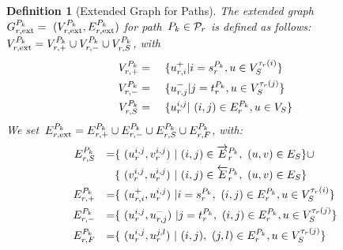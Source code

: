 \documentclass[10pt, conference, letterpaper]{IEEEtran}
\newtheorem{definition}[theorem]{Definition}
\begin{document}
\begin{definition}[Extended Graph for Paths]
\label{def:service-cactus-extended-graph-path}
The extended graph~$\VGextpath =~(\VVextpath, \VEextpath)$ for path~$P_k \in \Paths$ is defined as follows:
$\VVextpath = \VVextpathSources \cup \VVextpathTargets \cup \VVextpathSubstrate$, with
{
\small
\begin{alignat*}{3}
\VVextpathSources & = &&~ \{ u^+_{r,i} | i = \VVpathSource, u \in \SVTypes[\Vtype(i)]\}\\
\VVextpathTargets & = &&~  \{ u^-_{r,j} | j = \VVpathTarget, u \in \SVTypes[\Vtype(j)]\} \\
\VVextpathSubstrate & = &&~ \{ u^{i,j}_{r} |~(i,j) \in  \VEpath, u \in \SV \}
\end{alignat*}
}
We set~$\VEextpath = \VEextpathSources \cup \VEextpathTargets \cup \VEextpathSubstrate \cup \VEextpathF$, with:
{
\small
\begin{alignat*}{3}
\VEextpathSubstrate && = & \{~(u^{i,j}_{\req}, v^{i,j}_{\req})~|~(i,j) \in  \VEpathSame,~(u,v) \in  \SE \} \cup \\
 && & \{~(v^{i,j}_{\req}, u^{i,j}_{\req})~|~(i,j) \in  \VEpathDiff,~(u,v) \in  \SE \} \\
\VEextpathSources && = & \{~(u^+_{\req,i}, u^{i,j}_{\req})~| i = \VVpathSource,~(i,j) \in  \VEpath, u \in \SVTypes[\Vtype(i)]\} \\
\VEextpathTargets &&= &\{~(u^{i,j}_{\req}, u^-_{\req,j})~| j = \VVpathTarget,~(i,j) \in  \VEpath, u \in \SVTypes[\Vtype(j)]\}  \\
\VEextpathF && = & \{~(u^{i,j}_{\req}, u^{j,l}_{\req})~|~(i,j),~(j,l) \in  \VEpath, u \in \SVTypes[\Vtype(j)] \}
\end{alignat*}
}
\end{definition}
\end{document}
